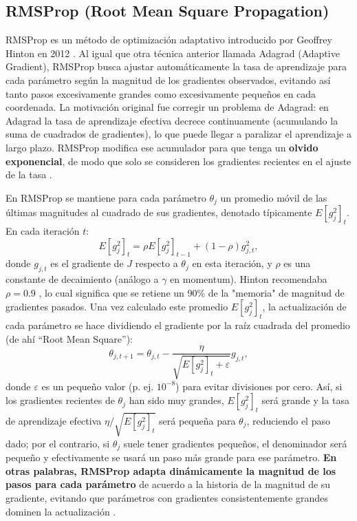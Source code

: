 \documentclass[12pt, spanish]{article}
\begin{document}
\subsection{RMSProp (Root Mean Square Propagation)}
RMSProp es un método de optimización adaptativo introducido por Geoffrey Hinton en 2012 \cite{ref3}. Al igual que otra técnica anterior llamada Adagrad (Adaptive Gradient), RMSProp busca ajustar automáticamente la tasa de aprendizaje para cada parámetro según la magnitud de los gradientes observados, evitando así tanto pasos excesivamente grandes como excesivamente pequeños en cada coordenada. La motivación original fue corregir un problema de Adagrad: en Adagrad la tasa de aprendizaje efectiva decrece continuamente (acumulando la suma de cuadrados de gradientes), lo que puede llegar a paralizar el aprendizaje a largo plazo. RMSProp modifica ese acumulador para que tenga un \textbf{olvido exponencial}, de modo que solo se consideren los gradientes recientes en el ajuste de la tasa \cite{ref3}.

En RMSProp se mantiene para cada parámetro $\theta_j$ un promedio móvil de las últimas magnitudes al cuadrado de sus gradientes, denotado típicamente $E[g_j^2]_t$. En cada iteración $t$:
\[
E[g_j^2]_t = \rho E[g_j^2]_{t-1} + (1 - \rho) g_{j,t}^2,
\]
donde $g_{j,t}$ es el gradiente de $J$ respecto a $\theta_j$ en esta iteración, y $\rho$ es una constante de decaimiento (análogo a $\gamma$ en momentum). Hinton recomendaba $\rho = 0.9$ \cite{ref3}, lo cual significa que se retiene un 90\% de la "memoria" de magnitud de gradientes pasados. Una vez calculado este promedio $E[g_j^2]_t$, la actualización de cada parámetro se hace dividiendo el gradiente por la raíz cuadrada del promedio (de ahí “Root Mean Square”):
\[
\theta_{j,t+1} = \theta_{j,t} - \frac{\eta}{\sqrt{E[g_j^2]_t + \varepsilon}} g_{j,t},
\]
donde $\varepsilon$ es un pequeño valor (p. ej. $10^{-8}$) para evitar divisiones por cero. Así, si los gradientes recientes de $\theta_j$ han sido muy grandes, $E[g_j^2]_t$ será grande y la tasa de aprendizaje efectiva $\eta / \sqrt{E[g_j^2]_t}$ será pequeña para $\theta_j$, reduciendo el paso dado; por el contrario, si $\theta_j$ suele tener gradientes pequeños, el denominador será pequeño y efectivamente se usará un paso más grande para ese parámetro. \textbf{En otras palabras, RMSProp adapta dinámicamente la magnitud de los pasos para cada parámetro} de acuerdo a la historia de la magnitud de su gradiente, evitando que parámetros con gradientes consistentemente grandes dominen la actualización \cite{ref3}.
\end{document}
